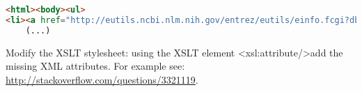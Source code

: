 \documentclass{article}
\begin{document}
\begin{lstlisting}[language=html]
<html><body><ul>
<li><a href="http://eutils.ncbi.nlm.nih.gov/entrez/eutils/einfo.fcgi?db=pubmed">pubmed</a></li>
    (...)
\end{lstlisting} 
\noindent
Modify the XSLT stylesheet: using the XSLT element \textless{}xsl:attribute/\textgreater  add the missing XML attributes. For example see: \url{http://stackoverflow.com/questions/3321119}.
\end{document}

